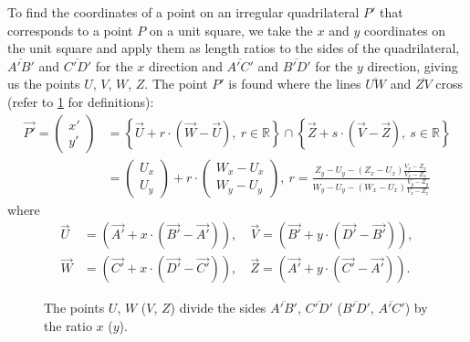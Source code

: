 To find the coordinates of a point on an irregular quadrilateral $P'$ that corresponds to a point $P$ on a unit square, we take the $x$ and $y$ coordinates on the unit square and apply them as length ratios to the sides of the quadrilateral, $\overline{A'B'}$ and $\overline{C'D'}$ for the $x$ direction and $\overline{A'C'}$ and $\overline{B'D'}$ for the $y$ direction, giving us the points $U$, $V$, $W$, $Z$. The point $P'$ is found where the lines $\overline{UW}$ and $\overline{ZV}$ cross (refer to \cref{fig:dmd_mapping_scheme} for definitions):
\begin{align*}
    \vec{P'} = \begin{pmatrix} x' \\ y'\end{pmatrix} &= \left\{ \vec{U} + r\cdot \left(\vec{W} - \vec{U}\right),\ r\in \mathbb{R} \right\} \cap \left\{ \vec{Z} + s\cdot \left(\vec{V} - \vec{Z}\right),\ s\in \mathbb{R} \right\} \\
    &= \begin{pmatrix} U_x \\ U_y\end{pmatrix} + r \cdot \begin{pmatrix} W_x - U_x \\ W_y - U_y\end{pmatrix},\ r = \frac{Z_y - U_y - (Z_x - U_x)\frac{V_x - Z_x}{V_x - Z_x}}{W_y - U_y - (W_x - U_x)\frac{V_y - Z_y}{V_x - Z_x}}
\end{align*}
where
\begin{align*}
    \vec{U} &= \left(\vec{A'} + x\cdot\left(\vec{B'} - \vec{A'}\right)\right), \quad \vec{V} = \left(\vec{B'} + y\cdot\left(\vec{D'} - \vec{B'}\right)\right),  \\
    \vec{W} &= \left(\vec{C'} + x\cdot\left(\vec{D'} - \vec{C'}\right)\right), \quad \vec{Z} = \left(\vec{A'} + y\cdot\left(\vec{C'} - \vec{A'}\right)\right). 
\end{align*}
\vfill
\begin{figure}[hbp]
    \centering
    
    \caption[Mapping a unit square onto an irregular quadrilateral]{The points $U$, $W$ ($V$, $Z$) divide the sides $\overline{A'B'}$, $\overline{C'D'}$ ($\overline{B'D'}$, $\overline{A'C'}$) by the ratio $x$ ($y$).}
    \label{fig:dmd_mapping_scheme}
\end{figure}
\vfill

